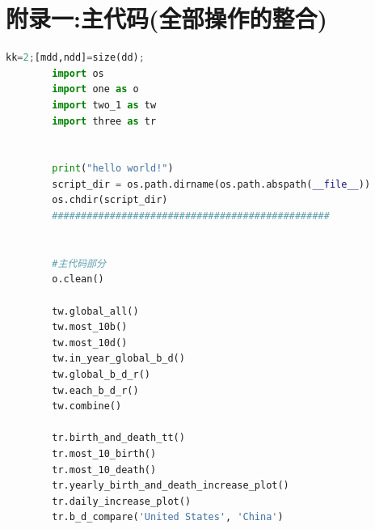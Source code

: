 \documentclass{ctexart}
\begin{document}
    \newpage
    \appendix
    \section{附录一:主代码(全部操作的整合)}
        \begin{lstlisting}[language=Python] %设置不同语言即可。
        kk=2;[mdd,ndd]=size(dd);
        import os
        import one as o
        import two_1 as tw
        import three as tr


        print("hello world!")
        script_dir = os.path.dirname(os.path.abspath(__file__))
        os.chdir(script_dir)
        ################################################


        #主代码部分
        o.clean()

        tw.global_all()
        tw.most_10b()
        tw.most_10d()
        tw.in_year_global_b_d()
        tw.global_b_d_r()
        tw.each_b_d_r()
        tw.combine()

        tr.birth_and_death_tt()
        tr.most_10_birth()
        tr.most_10_death()
        tr.yearly_birth_and_death_increase_plot()
        tr.daily_increase_plot()
        tr.b_d_compare('United States', 'China')


        \end{lstlisting}
    \newpage
\end{document}
